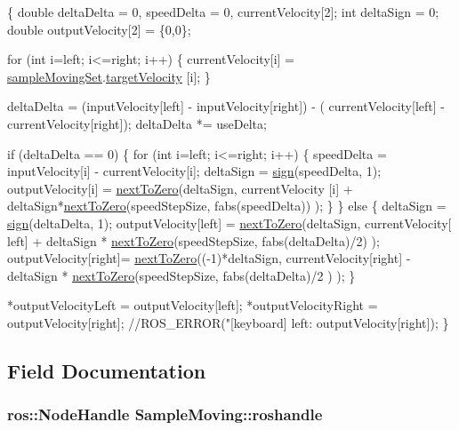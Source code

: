 \begin{DoxyCode}
\{
    \textcolor{keywordtype}{double} deltaDelta = 0, speedDelta = 0, currentVelocity[2];
    \textcolor{keywordtype}{int}  deltaSign = 0;
    \textcolor{keywordtype}{double} outputVelocity[2] = \{0,0\};

    \textcolor{keywordflow}{for} (\textcolor{keywordtype}{int} i=left; i<=right; i++) \{
        currentVelocity[i] = \hyperlink{classSampleMoving_af9c7dc0be1c4197469fbfa7aa105f1cc}{sampleMovingSet}.\hyperlink{structSampleMoving_1_1sampleMovingSettingStruct_a1fd52fce6a806d0ee764867ab142b255}{targetVelocity}
      [i];
    \}

    deltaDelta = (inputVelocity[left] - inputVelocity[right]) - (
      currentVelocity[left] - currentVelocity[right]);
    deltaDelta *= useDelta;

    \textcolor{keywordflow}{if} (deltaDelta == 0) \{
        \textcolor{keywordflow}{for} (\textcolor{keywordtype}{int} i=left; i<=right; i++) \{
            speedDelta = inputVelocity[i] - currentVelocity[i];
            deltaSign = \hyperlink{classSampleMoving_a0b5fbcfe6d0bf2d3de142758089f560b}{sign}(speedDelta, 1);
            outputVelocity[i] = \hyperlink{classSampleMoving_a40aff4fa58009d08161ce9720c0ea4ef}{nextToZero}(deltaSign, currentVelocity
      [i] + deltaSign*\hyperlink{classSampleMoving_a40aff4fa58009d08161ce9720c0ea4ef}{nextToZero}(speedStepSize, fabs(speedDelta)) );
        \}
    \} \textcolor{keywordflow}{else} \{
        deltaSign = \hyperlink{classSampleMoving_a0b5fbcfe6d0bf2d3de142758089f560b}{sign}(deltaDelta, 1);
        outputVelocity[left] = \hyperlink{classSampleMoving_a40aff4fa58009d08161ce9720c0ea4ef}{nextToZero}(deltaSign, currentVelocity[
      left] + deltaSign * \hyperlink{classSampleMoving_a40aff4fa58009d08161ce9720c0ea4ef}{nextToZero}(speedStepSize, fabs(deltaDelta)/2) );
        outputVelocity[right]= \hyperlink{classSampleMoving_a40aff4fa58009d08161ce9720c0ea4ef}{nextToZero}((-1)*deltaSign, 
      currentVelocity[right] - deltaSign * \hyperlink{classSampleMoving_a40aff4fa58009d08161ce9720c0ea4ef}{nextToZero}(speedStepSize, fabs(deltaDelta)/2
      ) );
    \}

     *outputVelocityLeft = outputVelocity[left];
     *outputVelocityRight = outputVelocity[right];
    \textcolor{comment}{//ROS\_ERROR("[keyboard] left: %
       outputVelocity[right]);}
\}
\end{DoxyCode}


\subsection{Field Documentation}
\hypertarget{classSampleMoving_aea05328d2394f244adba6fa37e3912d9}{
\subsubsection[{roshandle}]{\setlength{\rightskip}{0pt plus 5cm}ros\-::\-Node\-Handle Sample\-Moving\-::roshandle\hspace{0.3cm}{\ttfamily [private]}}}\label{classSampleMoving_aea05328d2394f244adba6fa37e3912d9}


